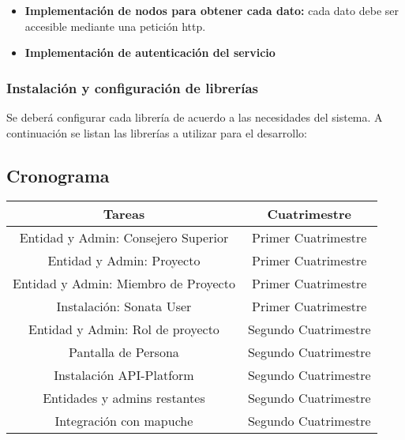 \begin{itemize}
    \item \textbf{Implementación de nodos para obtener cada dato:} cada dato debe ser accesible mediante una petición http.
    \item \textbf{Implementación de autenticación del servicio}
\end{itemize}

\subsubsection{Instalación y configuración de librerías}%
\label{ssub:instalación_y_configuración_de_librerias}
Se deberá configurar cada librería de acuerdo a las necesidades del sistema.
A continuación se listan las librerías a utilizar para el desarrollo:

\begin{itemize}
    
\end{itemize}

\newpage
\subsection{Cronograma}
\label{sub:cronograma}

\begin{center}

    \begin{tabular}{| c c |}
        \hline
        \textbf{Tareas} & \textbf{Cuatrimestre} \\
        \hline
        Entidad y Admin: Consejero Superior & Primer Cuatrimestre \\
        \hline
        Entidad y Admin: Proyecto & Primer Cuatrimestre \\
        \hline
        Entidad y Admin: Miembro de Proyecto & Primer Cuatrimestre \\
        \hline
        Instalación: Sonata User & Primer Cuatrimestre  \\
        \hline
        Entidad y Admin: Rol de proyecto & Segundo Cuatrimestre \\
        \hline
        Pantalla de Persona & Segundo Cuatrimestre \\
        \hline
        Instalación API-Platform & Segundo Cuatrimestre \\
        \hline
        Entidades y admins restantes & Segundo Cuatrimestre \\
        \hline
        Integración con mapuche & Segundo Cuatrimestre \\
        \hline


    \end{tabular}


\end{center}
